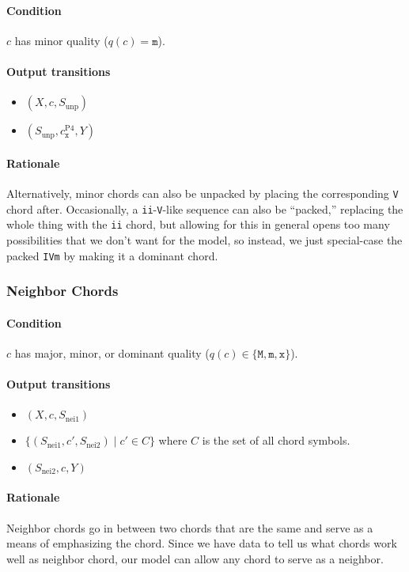 \documentclass[]{article}
\begin{document}
\paragraph{Condition} $c$ has minor quality ($q(c) = \texttt{m}$).

\paragraph{Output transitions}
\begin{itemize}
	\item $(X, c, S_\textrm{unp})$
	\item $(S_\textrm{unp}, c_\texttt{x}^\textrm{P4}, Y)$
\end{itemize}

\paragraph{Rationale} Alternatively, minor chords can also be unpacked by placing the corresponding \texttt{V} chord after.  Occasionally, a \texttt{ii}-\texttt{V}-like sequence can also be ``packed,'' replacing the whole thing with the \texttt{ii} chord, but allowing for this in general opens too many possibilities that we don't want for the model, so instead, we just special-case the packed \texttt{IVm} by making it a dominant chord.

\subsubsection{Neighbor Chords}
\paragraph{Condition} $c$ has major, minor, or dominant quality ($q(c) \in \{\texttt{M}, \texttt{m}, \texttt{x}\}$).

\paragraph{Output transitions}
\begin{itemize}
	\item $(X, c, S_\textrm{nei1})$
	\item $\{(S_\textrm{nei1}, c', S_\textrm{nei2}) \mid c' \in C\}$ where $C$ is the set of all chord symbols.
	\item $(S_\textrm{nei2}, c, Y)$
\end{itemize}

\paragraph{Rationale} Neighbor chords go in between two chords that are the same and serve as a means of emphasizing the chord.  Since we have data to tell us what chords work well as neighbor chord, our model can allow any chord to serve as a neighbor.
\end{document}
